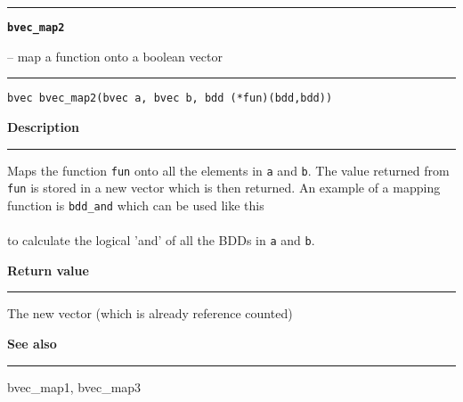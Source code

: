 \begin{minipage}{\textwidth}

\noindent\begin{minipage}{\textwidth}
\rule{\textwidth}{0.5mm}
{\tt\bf bvec\_map2 }
\--- map a function onto a boolean vector  \hspace{\fill}
\\\rule[1.5ex]{\textwidth}{0.5mm}
\end{minipage}

\noindent\begin{verbatim}
bvec bvec_map2(bvec a, bvec b, bdd (*fun)(bdd,bdd)) 
\end{verbatim}

\vspace{\parsep}\noindent
{\bf Description}\\\rule[1.5ex]{\textwidth}{0.2mm}\vspace{-1.5ex}\setlength{\parindent}{1em}
Maps the function {\tt fun} onto all the elements in {\tt a} and
           {\tt b}. The value returned from {\tt fun} is stored in a new
	   vector which is then returned. An example of a mapping function
	   is {\tt bdd\_and} which can be used like this\\

	   \\

	   \noindent to calculate the logical 'and' of all the BDDs in
	   {\tt a} and {\tt b}. 

\setlength{\parindent}{0em}\vspace{\parsep}\vspace{\baselineskip}\noindent
{\bf Return value}\\\rule[1.5ex]{\textwidth}{0.2mm}\vspace{-1.5ex}
The new vector (which is already reference counted) 

\vspace{\parsep}\vspace{\baselineskip}\noindent
{\bf See also}\\\rule[1.5ex]{\textwidth}{0.2mm}\vspace{-1.5ex}
bvec\_map1, bvec\_map3 
\end{minipage}
\vspace{8ex}
